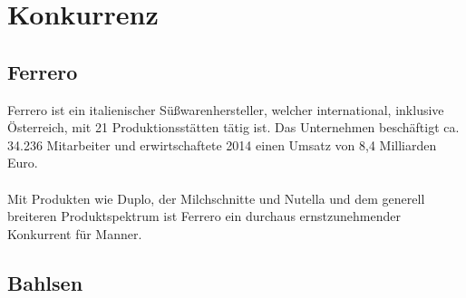 \section{Konkurrenz}
\subsection{Ferrero}
Ferrero ist ein italienischer Süßwarenhersteller, welcher international, inklusive Österreich, mit 21 Produktionsstätten tätig ist. Das Unternehmen beschäftigt ca. 34.236 Mitarbeiter und erwirtschaftete 2014 einen Umsatz von 8,4 Milliarden Euro. \cite{wiki_ferrero} \\\\
Mit Produkten wie Duplo, der Milchschnitte und Nutella und dem generell breiteren Produktspektrum ist Ferrero ein durchaus ernstzunehmender Konkurrent für Manner.
\subsection{Bahlsen}
